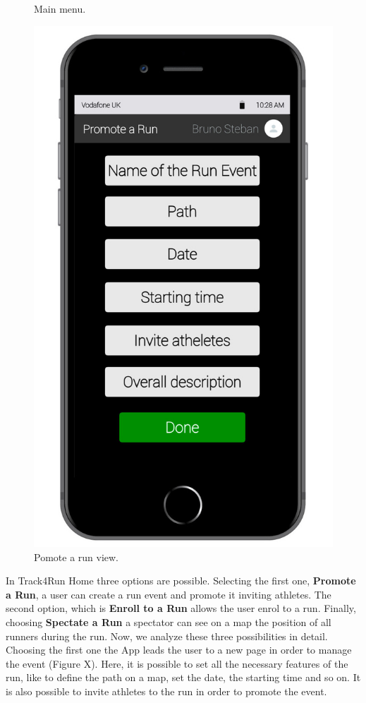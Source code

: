 \begin{enumerate}
\begin{figure}[H]
\begin{center}
\begin{minipage}[c]{.40\textwidth}
	\caption{Main menu.}
        \end{minipage}%
        \hspace{10mm}%
        \begin{minipage}[c]{.40\textwidth}
        \centering
          \includegraphics[height=14 cm]{Images/Mockups/Track4RunMockup6.jpg}
	\caption{Pomote a run view.}
        \end{minipage}
      \end{center}
\end{figure}
In Track4Run Home three options are possible. Selecting the first one, \textbf{Promote a Run}, a user can create a run event and promote it inviting athletes. The second option, which is \textbf{Enroll to a Run} allows the user enrol to a run. Finally, choosing \textbf{Spectate a Run} a spectator can see on a map the position of all runners during the run. Now, we analyze these three possibilities in detail. Choosing the first one the App leads the user to a new page in order to manage the event (Figure X). Here, it is possible to set all the necessary features of the run, like to define the path on a map, set the date, the starting time and so on. It is also possible to invite athletes to the run in order to promote the event.
\clearpage
\begin{figure}[H]

\end{figure}
\end{enumerate}
